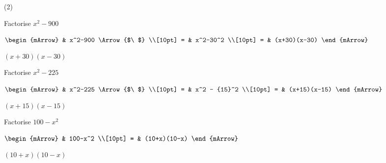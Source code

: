 \begin{mtask}(2)
   \task \begin{exercise} Factorise $x^2-900$\\
            \begin{envSolution}[height=3cm]       
			     $\begin{mArrow}
			             & x^2-900            \Arrow{$\ $} \\[10pt]
                       = & x^2-30^2                       \\[10pt]
                       = & (x+30)(x-30)     				   
	              \end{mArrow}$

                 \begin{shortsolution}  
				       $(x+30)(x-30)$
			     \end{shortsolution}				 
            \end{envSolution}
         \end{exercise}

   \task \begin{exercise} Factorise $x^2-225$\\
            \begin{envSolution}[height=3cm]
			  $\begin{mArrow}
			             & x^2-225            \Arrow{$\ $} \\[10pt]
                       = & x^2 - {15}^2                       \\[10pt]
                       = & (x+15)(x-15)     				   
	           \end{mArrow}$

                 \begin{shortsolution}  
				       $(x+15)(x-15)$
			     \end{shortsolution}				 
            \end{envSolution}
         \end{exercise}


   \task \begin{exercise} Factorise $100-x^2$\\
             \begin{envSolution}
			      
			      $\begin{mArrow}
			           & 100-x^2                      \\[10pt]    
					 = & (10+x)(10-x) 
				 \end{mArrow}$
                 \begin{shortsolution}  
				       $(10+x)(10-x) $
			     \end{shortsolution}				 
               \end{envSolution}
         \end{exercise}


\end{mtask}

